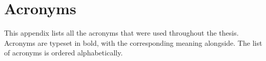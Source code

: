 \chapter{Acronyms}
\label{app:acronyms}

This appendix lists all the acronyms that were used throughout the thesis. Acronyms are typeset in bold, with the corresponding meaning alongside. The list of acronyms is ordered alphabetically.

\printacronyms

